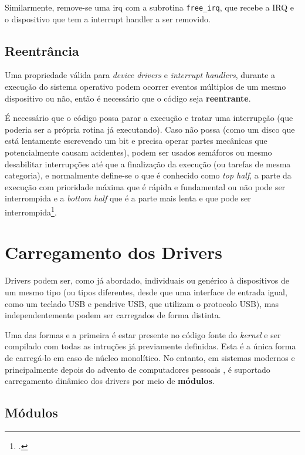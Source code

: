 \documentclass[
	12pt,			
	openright,			%
	twoside,			%
	a4paper,			%
	english,			%
	brazil,				%
	]{abntex2}
\begin{document}
Similarmente, remove-se uma irq com a subrotina \lstinline{free_irq}, que recebe 
a IRQ e o dispositivo que tem a interrupt handler a ser removido.

\subsection{Reentrância}

Uma propriedade válida para \emph{device drivers} e \emph{interrupt handlers},
durante a execução do sistema operativo podem ocorrer eventos múltiplos
de um mesmo dispositivo ou não, então é necessário que o código seja \textbf{reentrante}.

É necessário que o código possa parar a execução e tratar uma interrupção (que
poderia ser a própria rotina já executando). Caso não possa (como um disco que
está lentamente escrevendo um bit e precisa operar partes mecânicas que
potencialmente causam acidentes), podem ser usados semáforos ou mesmo
desabilitar interrupções até que a finalização da execução (ou tarefas de mesma
categoria), e normalmente define-se o que é conhecido como \emph{top half}, a
parte da execução com prioridade máxima que é rápida e fundamental ou não pode
ser interrompida e a \emph{bottom half} que é a parte mais lenta e que pode ser
interrompida\footcite{topbottomhalves}.

\section{Carregamento dos Drivers}

Drivers podem ser, como já abordado, individuais ou genérico à
dispositivos de um mesmo tipo (ou tipos diferentes, desde que uma interface de
entrada igual, como um teclado USB e pendrive USB, que utilizam o protocolo
USB), mas independentemente podem ser carregados de forma distinta.

Uma das formas e a primeira é estar presente no código fonte do \emph{kernel} e ser
compilado com todas as intruções já previamente definidas. Esta é a única forma
de carregá-lo em caso de núcleo monolítico. No entanto, em sistemas modernos e
principalmente depois do advento de computadores pessoais \cite{TanenbaumBos14},
é suportado carregamento dinâmico dos drivers por meio de \textbf{módulos}.

\subsection{Módulos}
\end{document}
